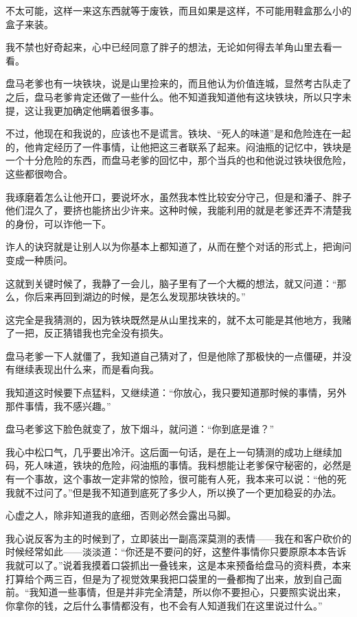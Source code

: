 不太可能，这样一来这东西就等于废铁，而且如果是这样，不可能用鞋盒那么小的盒子来装。

我不禁也好奇起来，心中已经同意了胖子的想法，无论如何得去羊角山里去看一看。

盘马老爹也有一块铁块，说是山里捡来的，而且他认为价值连城，显然考古队走了之后，盘马老爹肯定还做了一些什么。他不知道我知道他有这块铁块，所以只字未提，这让我更加确定他瞒着很多事。

不过，他现在和我说的，应该也不是谎言。铁块、“死人的味道”是和危险连在一起的，他肯定经历了一件事情，让他把这三者联系了起来。闷油瓶的记忆中，铁块是一个十分危险的东西，而盘马老爹的回忆中，那个当兵的也和他说过铁块很危险，这些都很吻合。

我琢磨着怎么让他开口，要说坏水，虽然我本性比较安分守己，但是和潘子、胖子他们混久了，要挤也能挤出少许来。这种时候，我能利用的就是老爹还弄不清楚我的身份，可以诈他一下。

诈人的诀窍就是让别人以为你基本上都知道了，从而在整个对话的形式上，把询问变成一种质问。

这就到关键时候了，我静了一会儿，脑子里有了一个大概的想法，就又问道：“那么，你后来再回到湖边的时候，是怎么发现那块铁块的。”

这完全是我猜测的，因为铁块既然是从山里找来的，就不太可能是其他地方，我赌了一把，反正猜错我也完全没有损失。

盘马老爹一下人就僵了，我知道自己猜对了，但是他除了那极快的一点僵硬，并没有继续表现出什么来，而是看向我。

我知道这时候要下点猛料，又继续道：“你放心，我只要知道那时候的事情，另外那件事情，我不感兴趣。”

盘马老爹这下脸色就变了，放下烟斗，就问道：“你到底是谁？”

我心中松口气，几乎要出冷汗。这后面一句话，是在上一句猜测的成功上继续加码，死人味道，铁块的危险，闷油瓶的事情。我料想能让老爹保守秘密的，必然是有一个事故，这个事故一定非常的惊险，很可能有人死，我本来可以说：“他的死我就不过问了。”但是我不知道到底死了多少人，所以换了一个更加稳妥的办法。

心虚之人，除非知道我的底细，否则必然会露出马脚。

我心说反客为主的时候到了，立即装出一副高深莫测的表情——我在和客户砍价的时候经常如此——淡淡道：“你还是不要问的好，这整件事情你只要原原本本告诉我就可以了。”说着我摸着口袋抓出一叠钱来，这是本来预备给盘马的资料费，本来打算给个两三百，但是为了视觉效果我把口袋里的一叠都掏了出来，放到自己面前。“我知道一些事情，但是并非完全清楚，所以你不要担心，只要照实说出来，你拿你的钱，之后什么事情都没有，也不会有人知道我们在这里说过什么。”

